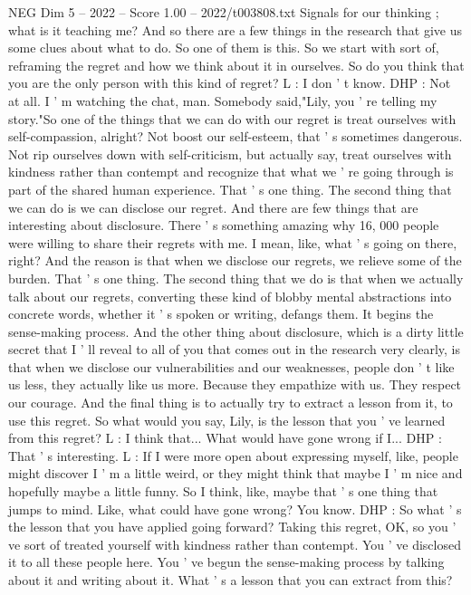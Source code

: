 \begin{textsample}{NEG Dim 5 – 2022 – Score 1.00 – 2022/t003808.txt}
Signals for our thinking ; what is it teaching me?
And so there are a few things in the research that give us some clues about what to do.
So one of them is this.
So we start with sort of, reframing the regret and how we think about it in ourselves.
So do you think that you are the only person with this kind of regret?
L : I don ' t know.
DHP : Not at all.
I ' m watching the chat, man.
Somebody said,"Lily, you ' re telling my story."So one of the things that we can do with our regret is treat ourselves with self-compassion, alright?
Not boost our self-esteem, that ' s sometimes dangerous.
Not rip ourselves down with self-criticism, but actually say, treat ourselves with kindness rather than contempt and recognize that what we ' re going through is part of the shared human experience.
That ' s one thing.
The second thing that we can do is we can disclose our regret.
And there are few things that are interesting about disclosure.
There ' s something amazing why 16, 000 people were willing to share their regrets with me.
I mean, like, what ' s going on there, right?
And the reason is that when we disclose our regrets, we relieve some of the burden.
That ' s one thing.
The second thing that we do is that when we actually talk about our regrets, converting these kind of blobby mental abstractions into concrete words, whether it ' s spoken or writing, defangs them.
It begins the sense-making process.
And the other thing about disclosure, which is a dirty little secret that I ' ll reveal to all of you that comes out in the research very clearly, is that when we disclose our vulnerabilities and our weaknesses, people don ' t like us less, they actually like us more.
Because they empathize with us.
They respect our courage.
And the final thing is to actually try to extract a lesson from it, to use this regret.
So what would you say, Lily, is the lesson that you ' ve learned from this regret?
L : I think that...
What would have gone wrong if I...
DHP : That ' s interesting.
L : If I were more open about expressing myself, like, people might discover I ' m a little weird, or they might think that maybe I ' m nice and hopefully maybe a little funny.
So I think, like, maybe that ' s one thing that jumps to mind.
Like, what could have gone wrong?
You know.
DHP : So what ' s the lesson that you have applied going forward?
Taking this regret, OK, so you ' ve sort of treated yourself with kindness rather than contempt.
You ' ve disclosed it to all these people here.
You ' ve begun the sense-making process by talking about it and writing about it.
What ' s a lesson that you can extract from this?

\end{textsample}
